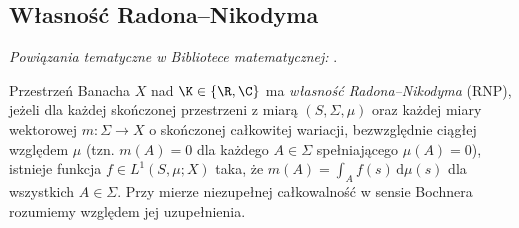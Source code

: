 \subsection{Własność Radona--Nikodyma}

\noindent\emph{Powiązania tematyczne w Bibliotece matematycznej:} .


\begin{definicja}
\label{def:rnp15b}
Przestrzeń Banacha $X$ nad $\K\in\{\R,\C\}$ ma
\emph{własność Radona--Nikodyma}
(RNP), jeżeli dla każdej skończonej przestrzeni z miarą
$(S,\Sigma,\mu)$ oraz każdej miary wektorowej
$m:\Sigma\to X$ o skończonej całkowitej wariacji,
bezwzględnie ciągłej względem $\mu$ (tzn. $m(A)=0$ dla
każdego $A\in\Sigma$ spełniającego $\mu(A)=0$), istnieje funkcja
$f\in L^1(S,\mu;X)$ taka, że
$m(A)=\int_Af(s)\,\mathrm d\mu(s)$ dla wszystkich $A\in\Sigma$.
Przy mierze niezupełnej całkowalność w sensie Bochnera
rozumiemy względem jej uzupełnienia.
\end{definicja}

